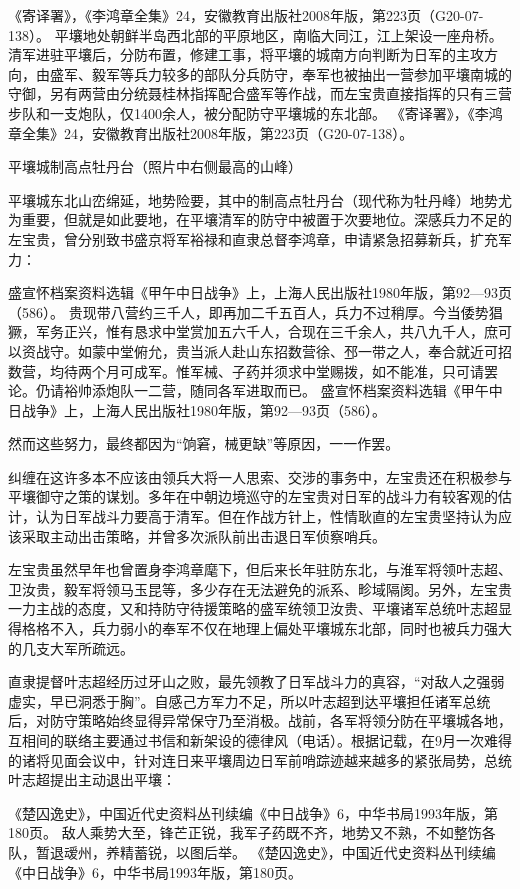 \documentclass[12pt,UTF8]{ctexbook}
\begin{document}
《寄译署》，《李鸿章全集》24，安徽教育出版社2008年版，第223页（G20-07-138）。
平壤地处朝鲜半岛西北部的平原地区，南临大同江，江上架设一座舟桥。清军进驻平壤后，分防布置，修建工事，将平壤的城南方向判断为日军的主攻方向，由盛军、毅军等兵力较多的部队分兵防守，奉军也被抽出一营参加平壤南城的守御，另有两营由分统聂桂林指挥配合盛军等作战，而左宝贵直接指挥的只有三营步队和一支炮队，仅1400余人，被分配防守平壤城的东北部。 《寄译署》，《李鸿章全集》24，安徽教育出版社2008年版，第223页（G20-07-138）。


平壤城制高点牡丹台（照片中右侧最高的山峰）

平壤城东北山峦绵延，地势险要，其中的制高点牡丹台（现代称为牡丹峰）地势尤为重要，但就是如此要地，在平壤清军的防守中被置于次要地位。深感兵力不足的左宝贵，曾分别致书盛京将军裕禄和直隶总督李鸿章，申请紧急招募新兵，扩充军力：

盛宣怀档案资料选辑《甲午中日战争》上，上海人民出版社1980年版，第92—93页（586）。
贵现带八营约三千人，即再加二千五百人，兵力不过稍厚。今当倭势猖獗，军务正兴，惟有恳求中堂赏加五六千人，合现在三千余人，共八九千人，庶可以资战守。如蒙中堂俯允，贵当派人赴山东招数营徐、邳一带之人，奉合就近可招数营，均待两个月可成军。惟军械、子药并须求中堂赐拨，如不能准，只可请罢论。仍请裕帅添炮队一二营，随同各军进取而已。 盛宣怀档案资料选辑《甲午中日战争》上，上海人民出版社1980年版，第92—93页（586）。

然而这些努力，最终都因为“饷窘，械更缺”等原因，一一作罢。

纠缠在这许多本不应该由领兵大将一人思索、交涉的事务中，左宝贵还在积极参与平壤御守之策的谋划。多年在中朝边境巡守的左宝贵对日军的战斗力有较客观的估计，认为日军战斗力要高于清军。但在作战方针上，性情耿直的左宝贵坚持认为应该采取主动出击策略，并曾多次派队前出击退日军侦察哨兵。

左宝贵虽然早年也曾置身李鸿章麾下，但后来长年驻防东北，与淮军将领叶志超、卫汝贵，毅军将领马玉昆等，多少存在无法避免的派系、畛域隔阂。另外，左宝贵一力主战的态度，又和持防守待援策略的盛军统领卫汝贵、平壤诸军总统叶志超显得格格不入，兵力弱小的奉军不仅在地理上偏处平壤城东北部，同时也被兵力强大的几支大军所疏远。

直隶提督叶志超经历过牙山之败，最先领教了日军战斗力的真容，“对敌人之强弱虚实，早已洞悉于胸”。自感己方军力不足，所以叶志超到达平壤担任诸军总统后，对防守策略始终显得异常保守乃至消极。战前，各军将领分防在平壤城各地，互相间的联络主要通过书信和新架设的德律风（电话）。根据记载，在9月一次难得的诸将见面会议中，针对连日来平壤周边日军前哨踪迹越来越多的紧张局势，总统叶志超提出主动退出平壤：

《楚囚逸史》，中国近代史资料丛刊续编《中日战争》6，中华书局1993年版，第180页。
敌人乘势大至，锋芒正锐，我军子药既不齐，地势又不熟，不如整饬各队，暂退叆州，养精蓄锐，以图后举。 《楚囚逸史》，中国近代史资料丛刊续编《中日战争》6，中华书局1993年版，第180页。
\end{document}
